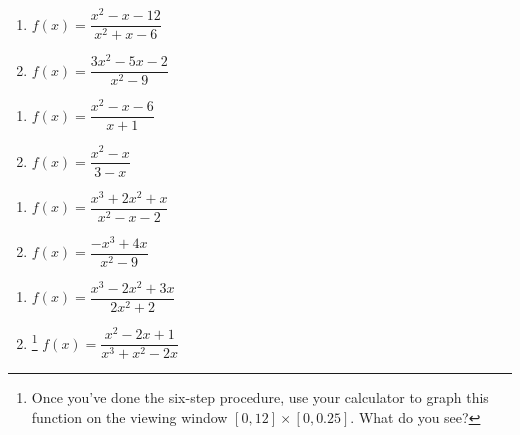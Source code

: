 \begin{multicols}{2}
\begin{enumerate}
\setcounter{enumi}{\value{HW}}

\item $f(x) = \dfrac{x^2-x-12}{x^2+x-6}$
\item $f(x) = \dfrac{3x^2-5x-2}{x^2-9}$

\setcounter{HW}{\value{enumi}}
\end{enumerate}
\end{multicols}

\begin{multicols}{2}
\begin{enumerate}
\setcounter{enumi}{\value{HW}}

\item $f(x) = \dfrac{x^2-x-6}{x+1}$

\item $f(x) = \dfrac{x^2-x}{3-x}$

\setcounter{HW}{\value{enumi}}
\end{enumerate}
\end{multicols}

\begin{multicols}{2}
\begin{enumerate}
\setcounter{enumi}{\value{HW}}

\item $f(x) = \dfrac{x^3+2x^2+x}{x^2-x-2}$

\item $f(x) = \dfrac{-x^{3} + 4x}{x^{2} - 9}$

\setcounter{HW}{\value{enumi}}
\end{enumerate}
\end{multicols}

\begin{multicols}{2}
\begin{enumerate}
\setcounter{enumi}{\value{HW}}

\item  $f(x) = \dfrac{x^3-2x^2+3x}{2x^2+2}$

\item \hspace{-0.1in}\footnote{Once you've done the six-step procedure, use your calculator to graph this function on the viewing window $[0, 12] \times [0, 0.25]$.  What do you see?} $f(x) = \dfrac{x^{2} - 2x + 1}{x^{3} + x^{2} - 2x}$ \label{sixsteplast}

\setcounter{HW}{\value{enumi}}
\end{enumerate}
\end{multicols}

